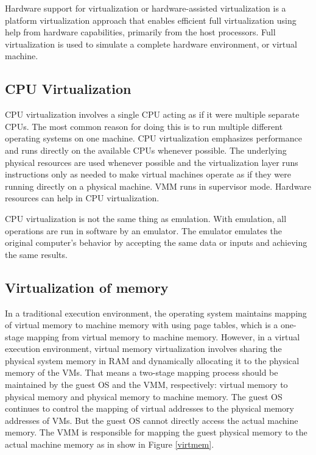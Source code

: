 \documentclass[12pt]{report}
\begin{document}
Hardware support for virtualization or hardware-assisted virtualization is a platform virtualization approach that enables efficient full virtualization using help from hardware capabilities, primarily from the host processors. Full virtualization is used to simulate a complete hardware environment, or virtual machine.

\subsection*{CPU Virtualization}

CPU virtualization involves a single CPU acting as if it were multiple separate CPUs. The most common reason for doing this is to run multiple different operating systems on one machine. CPU virtualization emphasizes performance and runs directly on the available CPUs whenever possible. The underlying physical resources are used whenever possible and the virtualization layer runs instructions only as needed to make virtual machines operate as if they were running directly on a physical machine. VMM runs in supervisor mode. Hardware resources can help in CPU virtualization.

CPU virtualization is not the same thing as emulation. With emulation, all operations are run in software by an emulator. The emulator emulates the original computer’s behavior by accepting the same data or inputs and achieving the same results.

\subsection*{Virtualization of memory}
In a traditional execution environment, the operating system maintains mapping of virtual memory to machine memory with using page tables, which is a one-stage mapping from virtual memory to machine memory. However, in a virtual execution environment, virtual memory virtualization involves sharing the physical system memory in RAM and dynamically allocating it to the physical memory of the VMs. That means a two-stage mapping process should be maintained by the guest OS and the VMM,
respectively: virtual memory to physical memory and physical memory to machine memory. The guest OS continues to control the mapping of virtual addresses to the physical memory addresses of VMs. But the guest OS cannot directly access the actual machine memory. The VMM
is responsible for mapping the guest physical memory to the actual machine memory as in show in Figure \ref{virtmem}.
\end{document}
